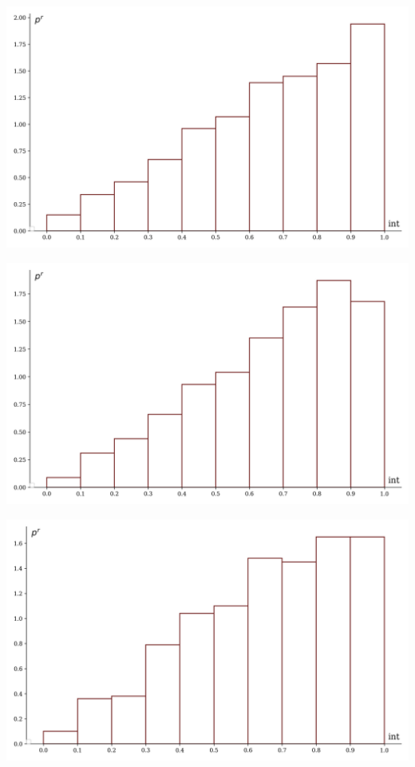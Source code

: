 \documentclass[a4paper, 14pt]{extarticle}
\begin{document}
\begin{minipage}[t]{0.25\textwidth}
\includegraphics[width=\textwidth, height=\textheight, keepaspectratio]{sample33_hist}
\end{minipage}%
\begin{minipage}[t]{0.25\textwidth}
\includegraphics[width=\textwidth, height=\textheight, keepaspectratio]{sample34_hist}
\end{minipage}%
\begin{minipage}[t]{0.25\textwidth}
\includegraphics[width=\textwidth, height=\textheight, keepaspectratio]{sample35_hist}
\end{minipage}%
\end{document}

